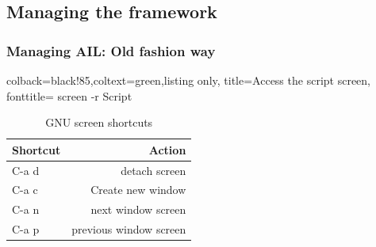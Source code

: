 \documentclass[aspectratio=169]{beamer}
\begin{document}
\subsection{Managing the framework}
\begin{frame}[fragile]
    \frametitle{Managing AIL: Old fashion way}
    \lstset{style=bash}
    \begin{tcblisting}{colback=black!85,coltext=green,listing only,
        title=Access the script screen, fonttitle=\bfseries}
screen -r Script
\end{tcblisting}
\begin{table}
        \caption{GNU screen shortcuts}
    \begin{tabular}{lr}
        \toprule
        Shortcut & Action \\
        \midrule
        C-a d & detach screen \\
        \midrule
        C-a c & Create new window \\
        \midrule
        C-a n & next window screen \\
        \midrule
        C-a p & previous window screen \\
        \bottomrule
    \end{tabular}
\end{table}
\end{frame}
\end{document}
